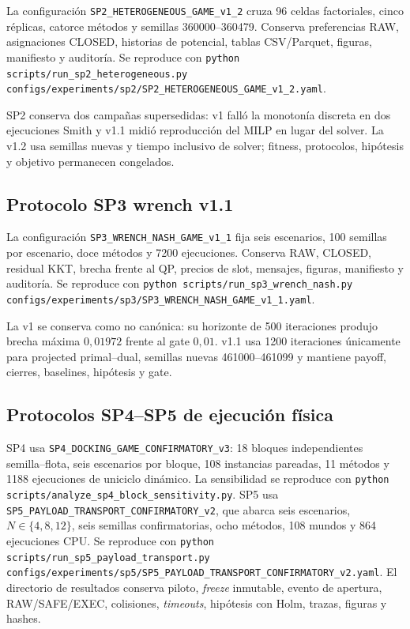 La configuración \texttt{SP2\_HETEROGENEOUS\_GAME\_v1\_2} cruza 96 celdas factoriales, cinco réplicas, catorce métodos y semillas 360000--360479. Conserva preferencias RAW, asignaciones CLOSED, historias de potencial, tablas CSV/Parquet, figuras, manifiesto y auditoría. Se reproduce con \texttt{python scripts/run\_sp2\_heterogeneous.py configs/experiments/sp2/SP2\_HETEROGENEOUS\_GAME\_v1\_2.yaml}.

SP2 conserva dos campañas supersedidas: v1 falló la monotonía discreta en dos ejecuciones Smith y v1.1 midió reproducción del MILP en lugar del solver. La v1.2 usa semillas nuevas y tiempo inclusivo de solver; fitness, protocolos, hipótesis y objetivo permanecen congelados.

\subsection*{Protocolo SP3 wrench v1.1}

La configuración \texttt{SP3\_WRENCH\_NASH\_GAME\_v1\_1} fija seis escenarios, 100 semillas por escenario, doce métodos y 7200 ejecuciones. Conserva RAW, CLOSED, residual KKT, brecha frente al QP, precios de slot, mensajes, figuras, manifiesto y auditoría. Se reproduce con \texttt{python scripts/run\_sp3\_wrench\_nash.py configs/experiments/sp3/SP3\_WRENCH\_NASH\_GAME\_v1\_1.yaml}.

La v1 se conserva como no canónica: su horizonte de 500 iteraciones produjo brecha máxima $0{,}01972$ frente al gate $0{,}01$. v1.1 usa 1200 iteraciones únicamente para projected primal--dual, semillas nuevas 461000--461099 y mantiene payoff, cierres, baselines, hipótesis y gate.

\subsection*{Protocolos SP4--SP5 de ejecución física}

SP4 usa \texttt{SP4\_DOCKING\_GAME\_CONFIRMATORY\_v3}: 18 bloques independientes semilla--flota, seis escenarios por bloque, 108 instancias pareadas, 11 métodos y 1188 ejecuciones de uniciclo dinámico. La sensibilidad se reproduce con \texttt{python scripts/analyze\_sp4\_block\_sensitivity.py}. SP5 usa \texttt{SP5\_PAYLOAD\_TRANSPORT\_CONFIRMATORY\_v2}, que abarca seis escenarios, $N\in\{4,8,12\}$, seis semillas confirmatorias, ocho métodos, 108 mundos y 864 ejecuciones CPU. Se reproduce con \texttt{python scripts/run\_sp5\_payload\_transport.py configs/experiments/sp5/SP5\_PAYLOAD\_TRANSPORT\_CONFIRMATORY\_v2.yaml}. El directorio de resultados conserva piloto, \emph{freeze} inmutable, evento de apertura, RAW/SAFE/EXEC, colisiones, \emph{timeouts}, hipótesis con Holm, trazas, figuras y hashes.

